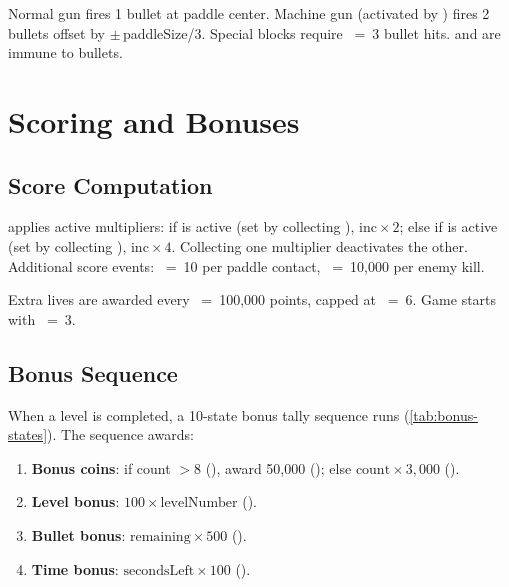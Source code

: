 \documentclass[11pt,a4paper]{article}
\begin{document}
Normal gun fires 1 bullet at paddle center. Machine gun (activated by ) fires 2 bullets offset by $\pm$\,paddleSize/3. Special blocks require ~=~3 bullet hits.  and  are immune to bullets.


\section{Scoring and Bonuses}
\label{sec:scoring}

\subsection{Score Computation}
\label{sec:score-comp}

 applies active multipliers: if  is active (set by collecting ), $\text{inc} \times 2$; else if  is active (set by collecting ), $\text{inc} \times 4$. Collecting one multiplier deactivates the other. Additional score events: ~=~10 per paddle contact, ~=~10,000 per enemy kill.

Extra lives are awarded every ~=~100,000 points, capped at ~=~6. Game starts with ~=~3.

\subsection{Bonus Sequence}
\label{sec:bonus-sequence}

When a level is completed, a 10-state bonus tally sequence runs (\cref{tab:bonus-states}). The sequence awards:

\begin{enumerate}[label=\arabic*.]
  \item \textbf{Bonus coins}: if count $> 8$ (), award 50,000 (); else $\text{count} \times 3{,}000$ ().
  \item \textbf{Level bonus}: $100 \times \text{levelNumber}$ ().
  \item \textbf{Bullet bonus}: $\text{remaining} \times 500$ ().
  \item \textbf{Time bonus}: $\text{secondsLeft} \times 100$ ().
\end{enumerate}
\end{document}
